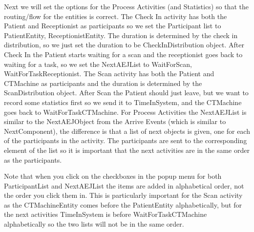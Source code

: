\documentclass[
  10pt,
  a4paperpaper,
  DIV=11,
  numbers=noendperiod,
  oneside]{scrreprt}
\begin{document}
Next we will set the options for the Process Activities (and Statistics)
so that the routing/flow for the entities is correct. The Check In
activity has both the Patient and Receptionist as participants so we set
the Participant list to PatientEntity, ReceptionistEntity. The duration
is determined by the check in distribution, so we just set the duration
to be CheckInDistribution object. After Check In the Patient starts
waiting for a scan and the receptionist goes back to waiting for a task,
so we set the NextAEJList to WaitForScan, WaitForTaskReceptionist. The
Scan activity has both the Patient and CTMachine as participants and the
duration is determined by the ScanDistribution object. After Scan the
Patient should just leave, but we want to record some statistics first
so we send it to TimeInSystem, and the CTMachine goes back to
WaitForTaskCTMachine. For Process Activities the NextAEJList is similar
to the NextAEJObject from the Arrive Events (which is similar to
NextComponent), the difference is that a list of next objects is given,
one for each of the participants in the activity. The participants are
sent to the corresponding element of the list so it is important that
the next activities are in the same order as the participants.

Note that when you click on the checkboxes in the popup menu for both
ParticipantList and NextAEJList the items are added in alphabetical
order, not the order you click them in. This is particularly important
for the Scan activity as the CTMachineEntity comes before the
PatientEntity alphabetically, but for the next activities TimeInSystem
is before WaitForTaskCTMachine alphabetically so the two lists will not
be in the same order.

\begin{table}

\caption{\label{tbl-pro_params}Process Activity Parameters}


\end{table}%
\end{document}
